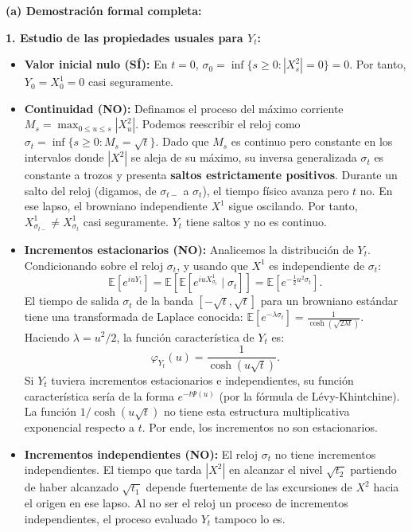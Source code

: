 \documentclass[11pt, letterpaper]{article}
\begin{document}
\begin{solucion}
    \vspace{3mm}
    \textbf{(a) Demostración formal completa:}

    \textbf{1. Estudio de las propiedades usuales para $Y_t$:}
    \begin{itemize}
        \item \textbf{Valor inicial nulo (SÍ):} 
        En $t=0$, $\sigma_0 = \inf\{s \ge 0 : |X_s^2| = 0\} = 0$. Por tanto, $Y_0 = X_0^1 = 0$ casi seguramente.
        
        \item \textbf{Continuidad (NO):} 
        Definamos el proceso del máximo corriente $M_s = \max_{0 \le u \le s} |X_u^2|$. Podemos reescribir el reloj como $\sigma_t = \inf\{s \ge 0 : M_s = \sqrt{t}\}$. 
        Dado que $M_s$ es continuo pero constante en los intervalos donde $|X^2|$ se aleja de su máximo, su inversa generalizada $\sigma_t$ es constante a trozos y presenta \textbf{saltos estrictamente positivos}. 
        Durante un salto del reloj (digamos, de $\sigma_{t-}$ a $\sigma_t$), el tiempo físico avanza pero $t$ no. En ese lapso, el browniano independiente $X^1$ sigue oscilando. Por tanto, $X^1_{\sigma_{t-}} \neq X^1_{\sigma_t}$ casi seguramente. $Y_t$ tiene saltos y no es continuo.

        \item \textbf{Incrementos estacionarios (NO):}
        Analicemos la distribución de $Y_t$. Condicionando sobre el reloj $\sigma_t$, y usando que $X^1$ es independiente de $\sigma_t$:
        \[ \mathbb{E}[e^{iu Y_t}] = \mathbb{E}[ \mathbb{E}[ e^{iu X_{\sigma_t}^1} \mid \sigma_t ] ] = \mathbb{E}[ e^{-\frac{1}{2} u^2 \sigma_t} ]. \]
        El tiempo de salida $\sigma_t$ de la banda $[-\sqrt{t}, \sqrt{t}]$ para un browniano estándar tiene una transformada de Laplace conocida: $\mathbb{E}[e^{-\lambda \sigma_t}] = \frac{1}{\cosh(\sqrt{2\lambda t})}$.
        Haciendo $\lambda = u^2/2$, la función característica de $Y_t$ es:
        \[ \varphi_{Y_t}(u) = \frac{1}{\cosh(u\sqrt{t})}. \]
        Si $Y_t$ tuviera incrementos estacionarios e independientes, su función característica sería de la forma $e^{-t \Psi(u)}$ (por la fórmula de Lévy-Khintchine). La función $1/\cosh(u\sqrt{t})$ no tiene esta estructura multiplicativa exponencial respecto a $t$. Por ende, los incrementos no son estacionarios.

        \item \textbf{Incrementos independientes (NO):}
        El reloj $\sigma_t$ no tiene incrementos independientes. El tiempo que tarda $|X^2|$ en alcanzar el nivel $\sqrt{t_2}$ partiendo de haber alcanzado $\sqrt{t_1}$ depende fuertemente de las excursiones de $X^2$ hacia el origen en ese lapso. Al no ser el reloj un proceso de incrementos independientes, el proceso evaluado $Y_t$ tampoco lo es.
    \end{itemize}


\end{solucion}
\end{document}
